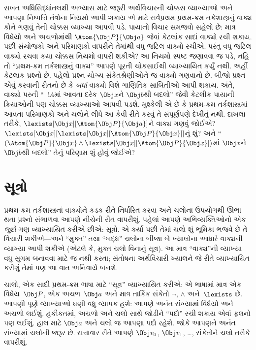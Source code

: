 સખત અધિસિદ્ધાંતલક્ષી અભ્યાસ માટે જરૂરી અર્થવિચારની ચોક્કસ વ્યાખ્યાઓ
અને આપણા નિષ્પત્તિ તંત્રોના નિયમો આપી શકાય એ માટે સર્વપ્રથમ
પ્રથમ-ક્રમ તર્કશાસ્ત્રનું વાક્ય કોને ગણવું તેની ચોક્કસ વ્યાખ્યા
આપવી પડે. પાયાનો વિચાર સમજવો સહેલો છે: માત્ર વિધેયો અને
અચળોમાંથી $\Atom{\Obj P}{\Obj a}$ જેવાં કેટલાંક સાદાં
વાક્યો રચી શકાય. પછી સંયોજકો અને પરિમાણકો વાપરીને તેમાંથી વધુ
જટિલ વાક્યો રચીએ. પરંતુ વધુ જટિલ વાક્યો રચવા કયા ચોક્કસ નિયમો
વાપરી શકીએ? આ નિયમો સ્પષ્ટ જણાવવા જ પડે, નહિ તો ``પ્રથમ-ક્રમ
તર્કશાસ્ત્રનું વાક્ય'' આપણે પૂરતી ચોકસાઈથી વ્યાખ્યાયિત કર્યું
નથી. અહીં કેટલાક પ્રશ્નો છે. પહેલો પ્રશ્ન યોગ્ય સંકેતશ્રેણીઓને જ
વાક્યો ગણવાનો છે. બીજો પ્રશ્ન એવું કરવાની રીતનો છે કે
\emph{બધાં} વાક્યો વિશે ગાણિતિક સાબિતીઓ આપી શકાય. અંતે,
વાક્યો પરની ``~$!A$માં આવતા દરેક $\Obj x$ને $\Obj b$થી બદલો''
જેવી કેટલીક પાયાની ક્રિયાઓની પણ ચોક્કસ વ્યાખ્યાઓ આપવી પડશે. મુશ્કેલી એ
છે કે પ્રથમ-ક્રમ તર્કશાસ્ત્રમાં આવતા પરિમાણકો અને ચલોને લીધે
આ કેવી રીતે કરવું તે સંપૂર્ણપણે દેખીતું નથી. દાખલા તરીકે,
$\lexists[\Obj x][\Atom{\Obj P}{\Obj a}]$ને વાક્ય ગણવું જોઈએ?
$\lexists[\Obj x][\lexists[\Obj x][\Atom{\Obj P}{\Obj x}]]$નું શું?
અને ``$(\Atom{\Obj P}{\Obj x} \land \lexists[\Obj x][\Atom{\Obj
P}{\Obj x}])$માં $\Obj x$ને $\Obj b$થી બદલો'' તેનું પરિણામ શું હોવું
જોઈએ?
\endgroup


\begingroup
\makeatletter{}\makeatother


\section{સૂત્રો}
\label{guunit:OLP-0142}


પ્રથમ-ક્રમ તર્કશાસ્ત્રનાં વાક્યોને કડક રીતે નિર્ધારિત કરવા અને
ચલોના ઉપયોગથી ઊભા થતા પ્રશ્નો સંભાળવા આપણે નીચેની રીત
વાપરીશું. પહેલાં આપણે અભિવ્યક્તિઓનો એક \emph{જુદો} ગણ વ્યાખ્યાયિત કરીએ છીએ:
સૂત્રો. એ કર્યા પછી તેમાં ચલો શું ભૂમિકા ભજવે છે તે
વિચારી શકીએ---અને ``મુક્ત'' તથા ``બદ્ધ'' ચલોના બીજા બે
ખ્યાલોના આધારે વાક્યની વ્યાખ્યા આપી શકીએ (એટલે કે, મુક્ત
ચલો વિનાનું સૂત્ર). આ માત્ર ``વાક્ય''ની
વ્યાખ્યા વધુ સુગમ બનાવવા માટે જ નથી કરતા; સંતોષના અર્થવિચારી ખ્યાલને
જે રીતે વ્યાખ્યાયિત કરીશું તેમાં પણ આ વાત અનિવાર્ય બનશે.

ચાલો, એક સાદી પ્રથમ-ક્રમ ભાષા માટે ``સૂત્ર'' વ્યાખ્યાયિત કરીએ:
એ ભાષામાં માત્ર એક વિધેય~$\Obj P$, એક અચળ~$\Obj a$
અને માત્ર તાર્કિક સંકેતો $\lnot$, $\land$ અને~$\lexists$ છે. આપણી
પૂર્ણ વ્યાખ્યાઓ ઘણી વધુ વ્યાપક હશે: આપણે અનંત સંખ્યામાં વિધેયો
અને અચળો લઈશું. હકીકતમાં, અચળો અને ચલો
સાથે જોડીને ``પદો'' રચી શકાય એવાં ફલનો પણ લઈશું. હાલ માટે
$\Obj a$ અને ચલો જ આપણા પદો રહેશે. જોકે આપણને અનંત સંખ્યામાં
ચલોની જરૂર છે. સત્તાવાર રીતે આપણે $\Obj v_0$, $\Obj v_1$,
\dots, સંકેતોને ચલો તરીકે વાપરીશું.

